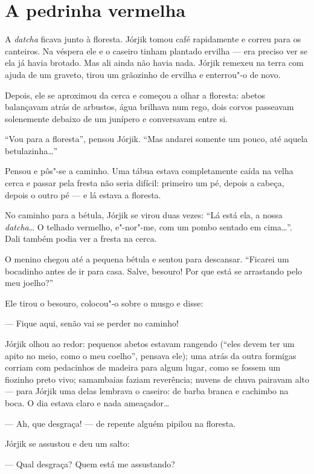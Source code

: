 \chapter{A pedrinha vermelha}

A \emph{datcha} ficava junto à floresta. Jórjik tomou café rapidamente e
correu para os canteiros. Na véspera ele e o caseiro tinham plantado
ervilha --- era preciso ver se ela já havia brotado. Mas ali ainda não
havia nada. Jórjik remexeu na terra com ajuda de um graveto, tirou um
grãozinho de ervilha e enterrou"-o de novo.

Depois, ele se aproximou da cerca e começou a olhar a floresta: abetos
balançavam atrás de arbustos, água brilhava num rego, dois corvos
passeavam solenemente debaixo de um junípero e conversavam entre si.

``Vou para a floresta'', pensou Jórjik. ``Mas andarei somente um pouco,
até aquela betulazinha\ldots{}''

Pensou e pôs"-se a caminho. Uma tábua estava completamente caída na velha
cerca e passar pela fresta não seria difícil: primeiro um pé, depois a
cabeça, depois o outro pé --- e lá estava a floresta.

No caminho para a bétula, Jórjik se virou duas vezes: ``Lá está ela, a
nossa \emph{datcha}\ldots{} O telhado vermelho, e"-nor"-me, com um pombo
sentado em cima\ldots{}''. Dali também podia ver a fresta na cerca.

O menino chegou até a pequena bétula e sentou para descansar. ``Ficarei
um bocadinho antes de ir para casa. Salve, besouro! Por que está se
arrastando pelo meu joelho?''

Ele tirou o besouro, colocou"-o sobre o musgo e disse:

--- Fique aqui, senão vai se perder no caminho!

Jórjik olhou ao redor: pequenos abetos estavam rangendo (``eles devem
ter um apito no meio, como o meu coelho'', pensava ele); uma atrás da
outra formigas corriam com pedacinhos de madeira para algum lugar, como
se fossem um fiozinho preto vivo; samambaias faziam reverência; nuvens
de chuva pairavam alto --- para Jórjik uma delas lembrava o caseiro: de
barba branca e cachimbo na boca. O dia estava claro e nada ameaçador\ldots{}

--- Ah, que desgraça! --- de repente alguém pipilou na floresta.

Jórjik se assustou e deu um salto:

--- Qual desgraça? Quem está me assustando?

